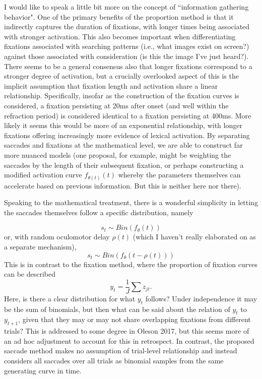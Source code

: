 I would like to speak a little bit more on the concept of ``information gathering behavior". One of the primary benefits of the proportion method is that it indirectly captures the duration of fixations, with longer times being associated with stronger activation. This also becomes important when differentiating fixations associated with searching patterns (i.e., what images exist on screen?) against those associated with consideration (is this the image I've just heard?). There seems to be a general consensus also that longer fixations correspond to a stronger degree of activation, but a crucially overlooked aspect of this is the implicit assumption that fixation length and activation share a linear relationship. Specifically, insofar as the construction of the fixation curves is considered, a fixation persisting at 20ms after onset (and well within the refraction period) is considered identical to a fixation persisting at 400ms. More likely it seems this would be more of an exponential relationship, with longer fixations offering increasingly more evidence of lexical activation. By separating saccades and fixations at the mathematical level, we are able to construct far more nuanced models (one proposal, for example, might be weighting the saccades by the length of their subsequent fixation, or perhaps constructing a modified activation curve $f_{\theta(t)}(t)$ whereby the parameters themselves can accelerate based on previous information. But this is neither here nor there).

Speaking to the mathematical treatment, there is a wonderful simplicity in letting the saccades themselves follow a specific distribution, namely

\begin{equation} \label{eq:saccade_dist}
s_t \sim Bin(f_{\theta}(t))
\end{equation}
or, with random oculomotor delay $\rho(t)$ (which I haven't really elaborated on as a separate mechanism), 
\begin{equation} \label{eq:saccade_dist_rho}
s_t \sim Bin(f_{\theta}(t-\rho(t)))
\end{equation}
This is in contrast to the fixation method, where the proportion of fixation curves can be described
\begin{equation} \label{eq:single_fix_measure}
y_t = \frac{1}{J} \sum z_{jt}.
\end{equation}
Here, is there a clear distribution for what $y_t$ follows? Under independence it may be the sum of binomials, but then what can be said about the relation of $y_t$ to $y_{t+1}$, given that they may or may not share overlapping fixations from different trials? This is addressed to some degree in Oleson 2017, but this seems more of an ad hoc adjustment to account for this in retrospect. In contrast, the proposed saccade method makes no assumption of trial-level relationship and instead considers all saccades over all trials as binomial samples from the same generating curve in time.

